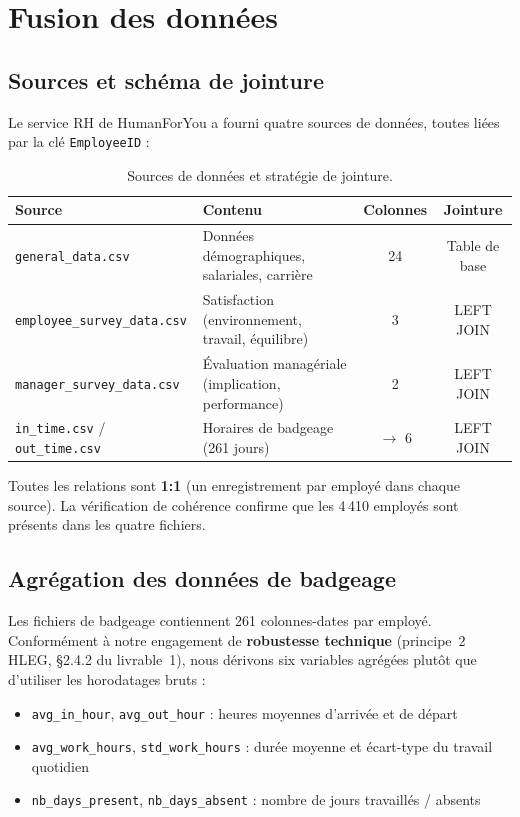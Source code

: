 \documentclass[12pt,a4paper]{article}
\begin{document}
\section{Fusion des données}

\subsection{Sources et schéma de jointure}

Le service RH de HumanForYou a fourni quatre sources de données, toutes liées par la clé \texttt{EmployeeID} :

\begin{table}[ht]
\centering
\begin{tabularx}{\textwidth}{lXcc}
\toprule
\textbf{Source} & \textbf{Contenu} & \textbf{Colonnes} & \textbf{Jointure} \\
\midrule
\texttt{general\_data.csv} & Données démographiques, salariales, carrière & 24 & Table de base \\
\texttt{employee\_survey\_data.csv} & Satisfaction (environnement, travail, équilibre) & 3 & LEFT JOIN \\
\texttt{manager\_survey\_data.csv} & Évaluation managériale (implication, performance) & 2 & LEFT JOIN \\
\texttt{in\_time.csv} / \texttt{out\_time.csv} & Horaires de badgeage (261 jours) & $\rightarrow$ 6 & LEFT JOIN \\
\bottomrule
\end{tabularx}
\caption{Sources de données et stratégie de jointure.}
\end{table}

Toutes les relations sont \textbf{1:1} (un enregistrement par employé dans chaque source). La vérification de cohérence confirme que les 4\,410 employés sont présents dans les quatre fichiers.

\subsection{Agrégation des données de badgeage}

Les fichiers de badgeage contiennent 261 colonnes-dates par employé. Conformément à notre engagement de \textbf{robustesse technique} (principe~2 HLEG, §2.4.2 du livrable~1), nous dérivons six variables agrégées plutôt que d'utiliser les horodatages bruts :

\begin{itemize}
    \item \texttt{avg\_in\_hour}, \texttt{avg\_out\_hour} : heures moyennes d'arrivée et de départ
    \item \texttt{avg\_work\_hours}, \texttt{std\_work\_hours} : durée moyenne et écart-type du travail quotidien
    \item \texttt{nb\_days\_present}, \texttt{nb\_days\_absent} : nombre de jours travaillés / absents
\end{itemize}
\end{document}
